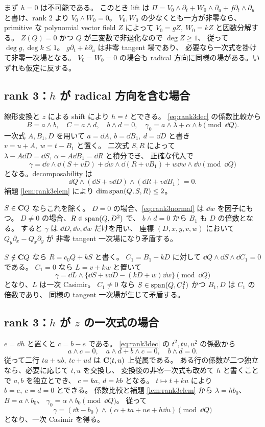 \documentclass[11pt,a4paper]{ltjsarticle}
\theoremstyle{remark}\newtheorem{remark}[theorem]{注意}\renewcommand{\proofname}{証明}
\begin{document}
まず $h=0$ は不可能である。
このとき lift は
$\Pi=V_0\wedge\partial_t+W_0\wedge\partial_u+f\partial_t\wedge\partial_u$
と書け、rank 2 より $V_0\wedge W_0=0$。
$V_0,W_0$ の少なくとも一方が非零なら、primitive な polynomial vector field $Z$ によって
$V_0=gZ,\ W_0=kZ$ と因数分解する。
$Z(Q)=0$ かつ $Q$ が三変数で非退化なので $\deg Z\ge1$、
従って $\deg g,\deg k\le1$。
$g\partial_t+k\partial_u$ は非零 tangent 場であり、
必要なら一次式を掛けて非零一次場となる。
$V_0=W_0=0$ の場合も radical 方向に同様の場がある。いずれも仮定に反する。

\subsection{rank 3：\texorpdfstring{$h$}{h} が radical 方向を含む場合}
線形変換と $z$ による shift により $h=t$ とできる。
\eqref{eq:rank3dec} の係数比較から
\[
 B=a\wedge b,\quad C=a\wedge d,\quad b\wedge d=0,\quad
 \gamma_0=a\wedge\lambda+\alpha\wedge b\pmod{\dd Q}.
\]
一次式 $A,B_1,D$ を用いて $a=\dd A,\ b=\dd B_1,\ d=\dd D$ と書き
$v=u+A,\ w=t-B_1$ と置く。
二次式 $S,R$ によって $\lambda-A\dd D=\dd S,\ \alpha-A\dd B_1=\dd R$ と積分でき、
正確な代入で
\begin{equation}\label{eq:rank3normal}
 \gamma=\dd v\wedge\dd(S+vD)
       +\dd w\wedge\dd(R+vB_1)+w\dd w\wedge\dd v
       \pmod{\dd Q}
\end{equation}
となる。decomposability は
\[
 \dd Q\wedge(\dd S+v\dd D)\wedge(\dd R+v\dd B_1)=0.
\]
補題 \ref{lem:rank3elem} により $\dim\operatorname{span}(Q,S,R)\le2$。

$S\in\mathbf C Q$ ならこれを除く。
$D=0$ の場合、\eqref{eq:rank3normal} は $\dd w$ を因子にもつ。
$D\ne0$ の場合、$R\in\operatorname{span}(Q,D^2)$ で、
$b\wedge d=0$ から $B_1$ も $D$ の倍数となる。
すると $\gamma$ は $\dd D,\dd v,\dd w$ だけを用い、
座標 $(D,x,y,v,w)$ において $Q_y\partial_x-Q_x\partial_y$ が
非零 tangent 一次場になり矛盾する。

$S\notin\mathbf C Q$ なら $R=c_0Q+kS$ と書く。
$C_1=B_1-kD$ に対して
$\dd Q\wedge\dd S\wedge\dd C_1=0$ である。
$C_1=0$ なら $L=v+kw$ と置いて
\[
 \gamma=\dd L\wedge\{\dd S+v\dd D-(kD+w)\dd w\}\pmod{\dd Q}
\]
となり、$L$ は一次 Casimir。
$C_1\ne0$ なら $S\in\operatorname{span}(Q,C_1^2)$ かつ $B_1,D$ は $C_1$ の倍数であり、
同様の tangent 一次場が生じて矛盾する。

\subsection{rank 3：\texorpdfstring{$h$}{h} が \texorpdfstring{$z$}{z} の一次式の場合}
$e=\dd h$ と置くと $c=b-e$ である。
\eqref{eq:rank3dec} の $t^2,tu,u^2$ の係数から
\[
 a\wedge c=0,\quad a\wedge d+b\wedge c=0,\quad b\wedge d=0.
\]
従って二行 $ta+ub,\ tc+ud$ は $\mathbf C(t,u)$ 上従属である。
ある行の係数が二つ独立なら、必要に応じて $t,u$ を交換し、
変換後の非零一次式も改めて $h$ と書くことで $a,b$ を独立とでき、
$c=ka,\ d=kb$ となる。
$t\mapsto t+ku$ により $b=e,\ c=d=0$ とできる。
係数比較と補題 \ref{lem:rank3elem} から
$\lambda=h b_0$、$B=a\wedge b_0$、
$\gamma_0=\alpha\wedge b_0\pmod{\dd Q}$。
従って
\[
 \gamma=(\dd t-b_0)\wedge(\alpha+ta+ue+h\dd u)\pmod{\dd Q}
\]
となり、一次 Casimir を得る。
\end{document}
